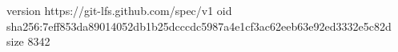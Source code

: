 version https://git-lfs.github.com/spec/v1
oid sha256:7eff853da89014052db1b25dcccdc5987a4e1cf3ac62eeb63e92ed3332e5c82d
size 8342
